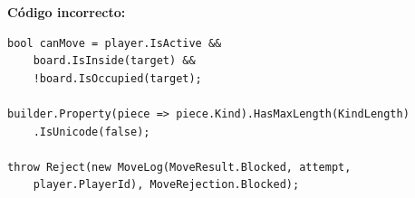 \textbf{Código incorrecto:}
\begin{lstlisting}[style=csharpstyle]
bool canMove = player.IsActive &&
    board.IsInside(target) &&
    !board.IsOccupied(target);

builder.Property(piece => piece.Kind).HasMaxLength(KindLength)
    .IsUnicode(false);

throw Reject(new MoveLog(MoveResult.Blocked, attempt,
    player.PlayerId), MoveRejection.Blocked);
\end{lstlisting}

